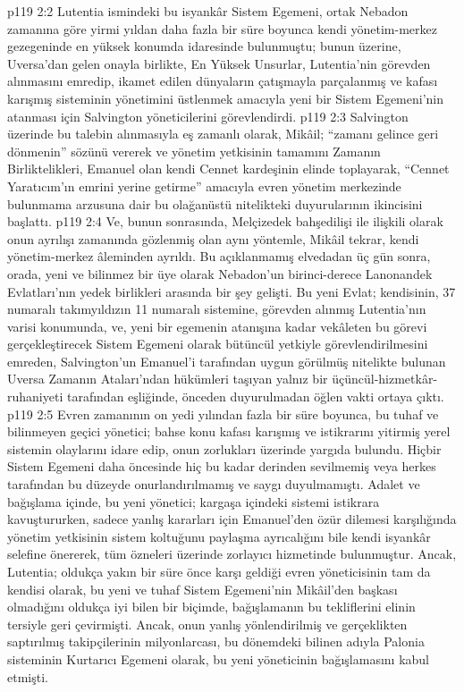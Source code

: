 \vs p119 2:2 Lutentia ismindeki bu isyankâr Sistem Egemeni, ortak Nebadon zamanına göre yirmi yıldan daha fazla bir süre boyunca kendi yönetim\hyp{}merkez gezegeninde en yüksek konumda idaresinde bulunmuştu; bunun üzerine, Uversa’dan gelen onayla birlikte, En Yüksek Unsurlar, Lutentia’nin görevden alınmasını emredip, ikamet edilen dünyaların çatışmayla parçalanmış ve kafası karışmış sisteminin yönetimini üstlenmek amacıyla yeni bir Sistem Egemeni’nin atanması için Salvington yöneticilerini görevlendirdi.
\vs p119 2:3 Salvington üzerinde bu talebin alınmasıyla eş zamanlı olarak, Mikâil; “zamanı gelince geri dönmenin” sözünü vererek ve yönetim yetkisinin tamamını Zamanın Birliktelikleri, Emanuel olan kendi Cennet kardeşinin elinde toplayarak, “Cennet Yaratıcım’ın emrini yerine getirme” amacıyla evren yönetim merkezinde bulunmama arzusuna dair bu olağanüstü nitelikteki duyurularının ikincisini başlattı.
\vs p119 2:4 Ve, bunun sonrasında, Melçizedek bahşedilişi ile ilişkili olarak onun ayrılışı zamanında gözlenmiş olan aynı yöntemle, Mikâil tekrar, kendi yönetim\hyp{}merkez âleminden ayrıldı. Bu açıklanmamış elvedadan üç gün sonra, orada, yeni ve bilinmez bir üye olarak Nebadon’un birinci\hyp{}derece Lanonandek Evlatları’nın yedek birlikleri arasında bir şey gelişti. Bu yeni Evlat; kendisinin, 37 numaralı takımyıldızın 11 numaralı sistemine, görevden alınmış Lutentia’nın varisi konumunda, ve, yeni bir egemenin atanışına kadar vekâleten bu görevi gerçekleştirecek Sistem Egemeni olarak bütüncül yetkiyle görevlendirilmesini emreden, Salvington’un Emanuel’i tarafından uygun görülmüş nitelikte bulunan Uversa Zamanın Ataları’ndan hükümleri taşıyan yalnız bir üçüncül\hyp{}hizmetkâr\hyp{}ruhaniyeti tarafından eşliğinde, önceden duyurulmadan öğlen vakti ortaya çıktı.
\vs p119 2:5 Evren zamanının on yedi yılından fazla bir süre boyunca, bu tuhaf ve bilinmeyen geçici yönetici; bahse konu kafası karışmış ve istikrarını yitirmiş yerel sistemin olaylarını idare edip, onun zorlukları üzerinde yargıda bulundu. Hiçbir Sistem Egemeni daha öncesinde hiç bu kadar derinden sevilmemiş veya herkes tarafından bu düzeyde onurlandırılmamış ve saygı duyulmamıştı. Adalet ve bağışlama içinde, bu yeni yönetici; kargaşa içindeki sistemi istikrara kavuştururken, sadece yanlış kararları için Emanuel’den özür dilemesi karşılığında yönetim yetkisinin sistem koltuğunu paylaşma ayrıcalığını bile kendi isyankâr selefine önererek, tüm özneleri üzerinde zorlayıcı hizmetinde bulunmuştur. Ancak, Lutentia; oldukça yakın bir süre önce karşı geldiği evren yöneticisinin tam da kendisi olarak, bu yeni ve tuhaf Sistem Egemeni’nin Mikâil’den başkası olmadığını oldukça iyi bilen bir biçimde, bağışlamanın bu tekliflerini elinin tersiyle geri çevirmişti. Ancak, onun yanlış yönlendirilmiş ve gerçeklikten saptırılmış takipçilerinin milyonlarcası, bu dönemdeki bilinen adıyla Palonia sisteminin Kurtarıcı Egemeni olarak, bu yeni yöneticinin bağışlamasını kabul etmişti.
